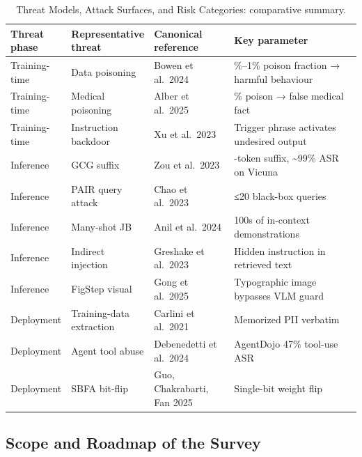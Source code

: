 \documentclass{article}
\begin{document}
\begin{table}[t]
\centering
\caption{Threat Models, Attack Surfaces, and Risk Categories: comparative summary.}
\label{tab:threat-models-attack-surfaces-and-risk-categories}
\begin{tabular}{>{\raggedright\arraybackslash}p{0.1226\linewidth}
  >{\raggedright\arraybackslash}p{0.2264\linewidth}
  >{\raggedright\arraybackslash}p{0.2453\linewidth}
  >{\raggedright\arraybackslash}p{0.4057\linewidth}}
\toprule
Threat phase & Representative threat & Canonical reference & Key parameter \\
\midrule
Training-time & Data poisoning & Bowen et al.~2024 & 0.1\%--1\% poison fraction → harmful behaviour \\
Training-time & Medical poisoning & Alber et al.~2025 & 0.001\% poison → false medical fact \\
Training-time & Instruction backdoor & Xu et al.~2023 & Trigger phrase activates undesired output \\
Inference & GCG suffix & Zou et al.~2023 & 20-token suffix, \textasciitilde99\% ASR on Vicuna \\
Inference & PAIR query attack & Chao et al.~2023 & ≤20 black-box queries \\
Inference & Many-shot JB & Anil et al.~2024 & 100s of in-context demonstrations \\
Inference & Indirect injection & Greshake et al.~2023 & Hidden instruction in retrieved text \\
Inference & FigStep visual & Gong et al.~2025 & Typographic image bypasses VLM guard \\
Deployment & Training-data extraction & Carlini et al.~2021 & Memorized PII verbatim \\
Deployment & Agent tool abuse & Debenedetti et al.~2024 & AgentDojo 47\% tool-use ASR \\
Deployment & SBFA bit-flip & Guo, Chakrabarti, Fan 2025 & Single-bit weight flip \\
\end{tabular}
\end{table}

\subsection{Scope and Roadmap of the Survey}\label{scope-and-roadmap-of-the-survey}
\end{document}

